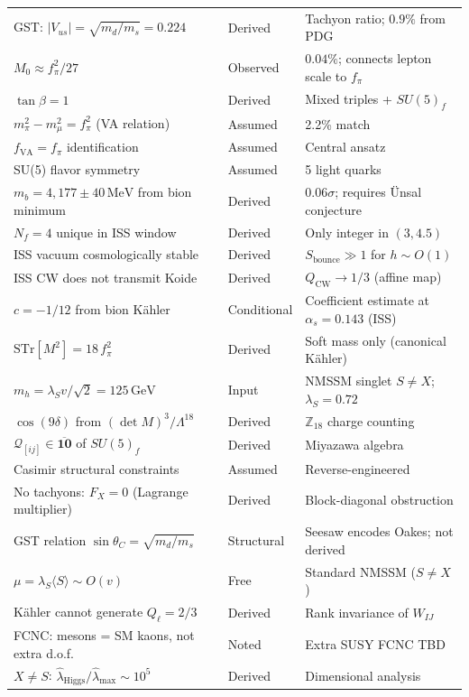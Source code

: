 \documentclass[12pt,a4paper]{article}
\newcommand{\MeV}{\,\text{MeV}}
\newcommand{\GeV}{\,\text{GeV}}
\newcommand{\fpi}{f_\pi}
\begin{document}
\begin{center}
\begin{tabular}{lll}
GST: $|V_{us}| = \sqrt{m_d/m_s} = 0.224$ & Derived & Tachyon ratio; $0.9\%$ from PDG~\cite{GST1968} \\
$M_0 \approx \fpi^2/27$ & Observed & $0.04\%$; connects lepton scale to $\fpi$ \\
$\tan\beta = 1$ & Derived & Mixed triples + $SU(5)_f$ \\
\midrule
$m_\pi^2 - m_\mu^2 = f_\pi^2$ (VA relation) & Assumed & 2.2\% match \\
$f_{\text{VA}} = f_\pi$ identification & Assumed & Central ansatz \\
SU(5) flavor symmetry & Assumed & 5 light quarks \\
$m_b = 4{,}177 \pm 40\MeV$ from bion minimum & Derived & $0.06\sigma$; requires \"Unsal conjecture \\
$N_f = 4$ unique in ISS window & Derived & Only integer in $(3, 4.5)$ \\
ISS vacuum cosmologically stable & Derived & $S_{\text{bounce}} \gg 1$ for $h \sim O(1)$ \\
ISS CW does not transmit Koide & Derived & $Q_{\text{CW}} \to 1/3$ (affine map) \\
$c = -1/12$ from bion K\"ahler & Conditional & Coefficient estimate at $\alpha_s = 0.143$ (ISS) \\
$\text{STr}[M^2] = 18\,\fpi^2$ & Derived & Soft mass only (canonical K\"ahler) \\
$m_h = \lambda_S v/\sqrt{2} = 125\GeV$ & Input & NMSSM singlet $S \neq X$; $\lambda_S = 0.72$ \\
$\cos(9\delta)$ from $(\det M)^3/\Lambda^{18}$ & Derived & $\mathbb{Z}_{18}$ charge counting \\
$\mathcal{Q}_{[ij]} \in \overline{\mathbf{10}}$ of $SU(5)_f$ & Derived & Miyazawa algebra \\
Casimir structural constraints & Assumed & Reverse-engineered \\
No tachyons: $F_X = 0$ (Lagrange multiplier) & Derived & Block-diagonal obstruction \\
GST relation $\sin\theta_C = \sqrt{m_d/m_s}$ & Structural & Seesaw encodes Oakes; not derived \\
$\mu = \lambda_S\langle S\rangle \sim O(v)$ & Free & Standard NMSSM ($S \neq X$) \\
K\"ahler cannot generate $Q_\ell = 2/3$ & Derived & Rank invariance of $W_{IJ}$ \\
FCNC: mesons = SM kaons, not extra d.o.f.\ & Noted & Extra SUSY FCNC TBD \\
$X \neq S$: $\hat\lambda_{\text{Higgs}}/\hat\lambda_{\text{max}} \sim 10^5$ & Derived & Dimensional analysis \\

\end{tabular}
\end{center}
\end{document}
